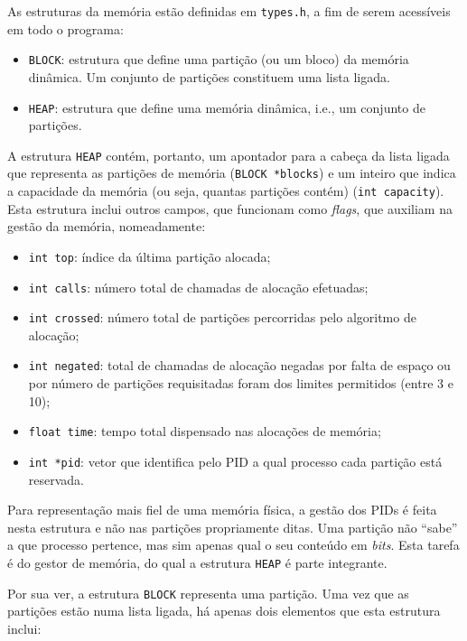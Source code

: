 \documentclass[10pt,oneside]{estiloUBI}
\begin{document}
	As estruturas da memória estão definidas em \verb|types.h|, a fim de serem acessíveis em todo o programa:
	\begin{itemize}
		\item \verb|BLOCK|: estrutura que define uma partição (ou um bloco) da memória dinâmica. Um conjunto de partições constituem uma lista ligada.
		\item \verb|HEAP|: estrutura que define uma memória dinâmica, i.e., um conjunto de partições.
	\end{itemize}

	A estrutura \verb|HEAP| contém, portanto, um apontador para a cabeça da lista ligada que representa as partições de memória (\texttt{BLOCK *blocks}) e um inteiro que indica a capacidade da memória (ou seja, quantas partições contém) (\texttt{int capacity}). Esta estrutura inclui outros campos, que funcionam como \textit{flags}, que auxiliam na gestão da memória, nomeadamente:
	
	\begin{itemize}
		\item \texttt{int top}: índice da última partição alocada;
		\item \texttt{int calls}: número total de chamadas de alocação efetuadas;
		\item \texttt{int crossed}: número total de partições percorridas pelo algoritmo de alocação;
		\item \texttt{int negated}: total de chamadas de alocação negadas por falta de espaço ou por número de partições requisitadas foram dos limites permitidos (entre 3 e 10);
		\item \texttt{float time}: tempo total dispensado nas alocações de memória;
		\item \texttt{int *pid}: vetor que identifica pelo \ac{PID} a qual processo cada partição está reservada.
	\end{itemize}

	Para representação mais fiel de uma memória física, a gestão dos \ac{PID}s é feita nesta estrutura e não nas partições propriamente ditas. Uma partição não ``sabe'' a que processo pertence, mas sim apenas qual o seu conteúdo em \textit{bits}. Esta tarefa é do gestor de memória, do qual a estrutura \verb|HEAP| é parte integrante.
	
	Por sua ver, a estrutura \verb|BLOCK| representa uma partição. Uma vez que as partições estão numa lista ligada, há apenas dois elementos que esta estrutura inclui:
	
\end{document}
